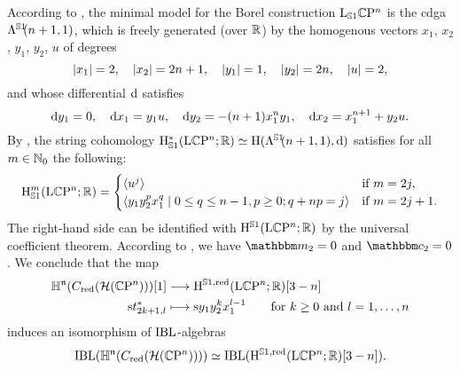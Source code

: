 \documentclass[\MainFolder/Text.tex]{subfiles}
\begin{document}
According to \cite[Section 3.1.2]{Basu2011}, the minimal model for the Borel construction $\mathrm{L}_{\mathbb{S}{1}} \mathbb{C}\mathrm{P}^n$ is the cdga $\Lambda^{\mathrlap{\Sph{1}}\hphantom{S}}(n+1,1)$, which is freely generated (over $\mathbb{R}$) by the homogenous vectors $x_1$, $x_2$, $y_1$, $y_2$, $u$ of degrees
$$ |x_1| = 2,\quad |x_2| = 2n+1,\quad |y_1| = 1,\quad |y_2| = 2n, \quad |u| = 2, $$
and whose differential $\mathrm{d}$ satisfies
$$ \mathrm{d} y_1 = 0,\quad \mathrm{d} x_1 = y_1 u,\quad \mathrm{d} y_2 = -(n+1) x_1^n y_1,\quad \mathrm{d} x_2 = x_1^{n+1} + y_2 u. $$
By \cite[Theorem 3.6]{Basu2011}, the string cohomology $\StringCoH^*(\Loop \CP^n; \R)\simeq \H(\Lambda^{\mathrlap{\Sph{1}}\hphantom{S}}(n+1,1),\Dd)$ satisfies for all $m\in \mathbb{N}_0$ the following:
\begin{align*}
\mathrm{H}_{\mathbb{S}{1}}^m(\mathrm{L} \mathbb{C}\mathrm{P}^n; \mathbb{R}) = \begin{cases} 
\langle u^j \rangle & \text{if }m=2j, \\
\langle y_1 y_2^p x_1^q \mid 0\le q \le n-1, p\ge 0; q + n p = j\rangle & \text{if }m=2j+1.
\end{cases}
\end{align*}
The right-hand side can be identified with $\mathrm{H}^{\mathbb{S}{1}}(\mathrm{L} \mathbb{C}\mathrm{P}^n; \mathbb{R})$ by the universal coefficient theorem. According to \cite[Proposition 3.7]{Basu2011}, we have $\StringOp_2 = 0$ and $\StringCoOp_2 = 0$. We conclude that the map
$$\begin{aligned}
 \mathbb{H}^{\mathfrak{n}}(C_{\mathrm{red}}(\mathcal{H}(\mathbb{C}\mathrm{P}^n)))[1] & \longrightarrow \mathrm{H}^{\mathbb{S}{1}, \mathrm{red}}(\mathrm{L} \mathbb{C}\mathrm{P}^n; \mathbb{R})[3-n] \\
\mathrm{s} t^*_{2k+1,l} & \longmapsto \mathrm{s} y_1 y_2^k x_1^{l-1}\qquad\text{for }k\ge 0\text{ and }l=1,\dotsc, n
\end{aligned} $$
induces an isomorphism of $\mathrm{IBL}$-algebras
$$ \mathrm{IBL}(\mathbb{H}^{\mathfrak{n}}(C_{\mathrm{red}}(\mathcal{H}(\mathbb{C}\mathrm{P}^n)))) \simeq \mathrm{IBL}(\mathrm{H}^{\mathbb{S}{1}, \mathrm{red}}(\mathrm{L} \mathbb{C}\mathrm{P}^n; \mathbb{R})[3-n]). $$
\end{document}
